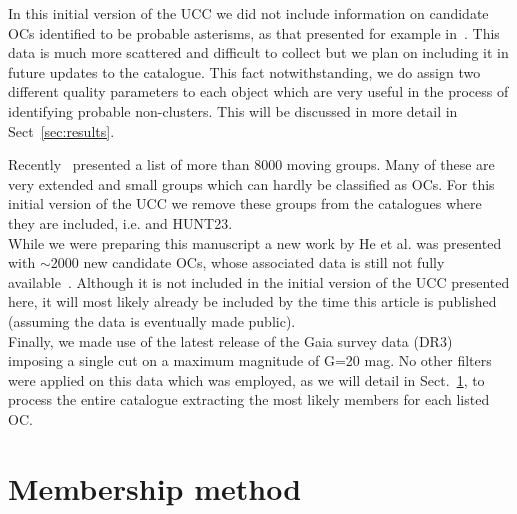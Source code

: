 \documentclass[fleqn,usenatbib]{mnras}
\begin{document}
In this initial version of the UCC we did not include information on
candidate OCs identified to be probable asterisms, as that presented for example
in~\cite{Cantat-Anders_2020}. This data is much more scattered and difficult to
collect but we plan on including it in future updates to the catalogue. This
fact notwithstanding, we do assign two different quality parameters to each
object which are very useful in the process of identifying probable
non-clusters. This will be discussed in more detail in Sect~\ref{sec:results}.

Recently~\cite{Kounkel_2020} presented a list of more than 8000 moving
groups. Many of these are very extended and small groups which
can hardly be classified as OCs. For this initial version of the UCC we remove
these groups from the catalogues where they are included, i.e.
\cite{He_2022_1} and HUNT23.\\

While we were preparing this manuscript a new work by He et al. was presented
with $\sim$2000 new candidate OCs, whose associated data is still not fully
available~\cite{He_2023_2}. Although it is not included in the initial version
of the UCC presented here, it will most likely already be included by the time
this article is published (assuming the data is eventually made public).\\

Finally, we made use of the latest release of the Gaia survey data
(DR3)~\citep{GaiaDR3_2022,Babusiaux_2022} imposing a single cut on a maximum
magnitude of G=20 mag. No other filters were applied on this data which was
employed, as we will detail in Sect.~\ref{sec:methods}, to process the entire
catalogue extracting the most likely members for each listed OC.






\section{Membership method}
\label{sec:methods}
\end{document}
